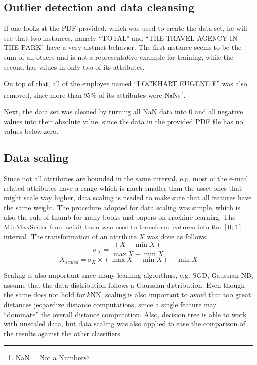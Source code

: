 \documentclass[11pt]{article}
\begin{document}
	\subsection{Outlier detection and data cleansing}
	
		If one looks at the PDF provided, which was used to create the data set, he will see that two instances, namely ``TOTAL'' and ``THE TRAVEL AGENCY IN THE PARK'' have a very distinct behavior.
		The first instance seems to be the sum of all others and is not a representative example for training, while the second has values in only two of its attributes.
	
		On top of that, all of the employee named ``LOCKHART EUGENE E'' was also removed, since more than 95\% of its attributes were NaNs\footnote{NaN = Not a Number}.
		
		Next, the data set was cleaned by turning all NaN data into $0$ and all negative values into their absolute value, since the data in the provided PDF file has no values below zero.
	
	\subsection{Data scaling}

		Since not all attributes are bounded in the same interval, e.g. most of the e-mail related attributes have a range which is much smaller than the asset ones that might scale way higher, data scaling is needed to make sure that all features have the same weight.
		The procedure adopted for data scaling was simple, which is also the rule of thumb for many books and papers on machine learning.
		The MinMaxScaler from scikit-learn was used to transform features into the $[0;1]$ interval.
		The transformation of an attribute $X$ was done as follows:
		\begin{displaymath}
			\sigma_X = \frac{(X - \min{X})}{\max{X} - \min{X}}
		\end{displaymath}
		\begin{displaymath}
			X_{scaled} = \sigma_X \times (\max{X} - \min{X}) + \min{X}
		\end{displaymath}
		
		Scaling is also important since many learning algorithms, e.g. SGD, Gaussian NB, assume that the data distribution follows a Gaussian distribution.
		Even though the same does not hold for $k$NN, scaling is also important to avoid that too great distances jeopardize distance computations, since a single feature may ``dominate'' the overall distance computation.
		Also, decision tree is able to work with unscaled data, but data scaling was also applied to ease the comparison of the results against the other classifiers.		
		
\end{document}
